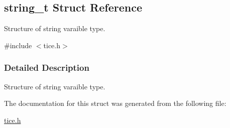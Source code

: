 \hypertarget{structstring__t}{}\subsection{string\+\_\+t Struct Reference}
\label{structstring__t}


Structure of string varaible type.  




{\ttfamily \#include $<$tice.\+h$>$}



\subsubsection{Detailed Description}
Structure of string varaible type. 

The documentation for this struct was generated from the following file\+:\begin{DoxyCompactItemize}
\item 
\hyperlink{tice_8h}{tice.\+h}\end{DoxyCompactItemize}
